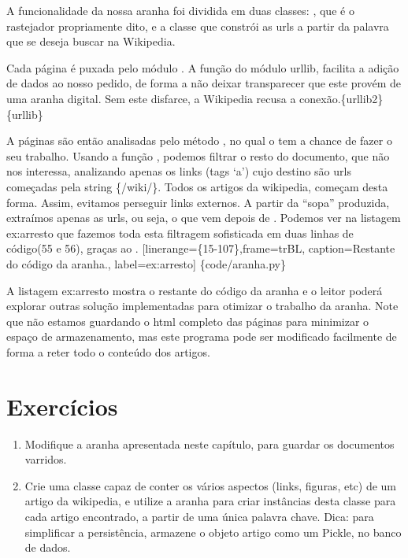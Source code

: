 \documentclass[a4paper,10pt,brazil]{sphinxmanual}
\begin{document}
A funcionalidade da nossa aranha foi dividida em duas classes:
, que é o rastejador propriamente dito, e a classe
 que constrói as urls a partir da palavra que se deseja
buscar na Wikipedia.

Cada página é puxada pelo módulo . A função
 do módulo urllib, facilita a adição de dados ao nosso
pedido, de forma a não deixar transparecer que este provém de uma
aranha digital. Sem este disfarce, a Wikipedia recusa a
conexão.\{urllib2\}\{urllib\}

A páginas são então analisadas pelo método , no qual o
 tem a chance de fazer o seu trabalho. Usando a
função , podemos filtrar o resto do documento, que
não nos interessa, analizando apenas os links (tags `a') cujo
destino são urls começadas pela string \{/wiki/\}. Todos os artigos
da wikipedia, começam desta forma. Assim, evitamos perseguir links
externos. A partir da ``sopa'' produzida, extraímos apenas as urls,
ou seja, o que vem depois de . Podemos ver na listagem
ex:arresto que fazemos toda esta filtragem sofisticada em duas
linhas de código(55 e 56), graças ao .
{[}linerange=\{15-107\},frame=trBL, caption=Restante do código da aranha., label=ex:arresto{]} \{code/aranha.py\}

A listagem ex:arresto mostra o restante do código da aranha e o
leitor poderá explorar outras solução implementadas para otimizar o
trabalho da aranha. Note que não estamos guardando o html completo
das páginas para minimizar o espaço de armazenamento, mas este
programa pode ser modificado facilmente de forma a reter todo o
conteúdo dos artigos.


\chapter{Exercícios}
\label{capbd:exercicios}\begin{enumerate}
\item {} 
Modifique a aranha apresentada neste capítulo, para guardar os
documentos varridos.

\item {} 
Crie uma classe capaz de conter os vários aspectos (links, figuras,
etc) de um artigo da wikipedia, e utilize a aranha para criar
instâncias desta classe para cada artigo encontrado, a partir de
uma única palavra chave. Dica: para simplificar a persistência,
armazene o objeto artigo como um Pickle, no banco de dados.

\end{enumerate}
\end{document}
